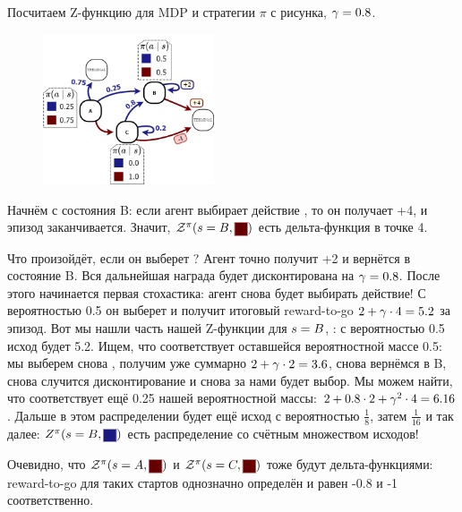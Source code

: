 \begin{exampleBox}[label=ex:zfunction]{}
Посчитаем Z-функцию для MDP и стратегии $\pi$ с рисунка, $\gamma \HM= 0.8$.

\begin{figure}
\vspace{-0.5cm}
\centering
\includegraphics[width=0.45\textwidth]{Images/Value.png}
\vspace{-0.9cm}
\end{figure}

Начнём с состояния B: если агент выбирает действие , то он получает +4, и эпизод заканчивается. Значит, $\Z^{\pi}(s \HM= B, \colorsquare{ChadRed})$ есть дельта-функция в точке 4.

Что произойдёт, если он выберет ? Агент точно получит +2 и вернётся в состояние B. Вся дальнейшая награда будет дисконтирована на $\gamma \HM= 0.8$. После этого начинается первая стохастика: агент снова будет выбирать действие! С вероятностью 0.5 он выберет  и получит итоговый reward-to-go $2 \HM+ \gamma \cdot 4 \HM= 5.2$ за эпизод. Вот мы нашли часть нашей Z-функции для $s \HM= B$, : с вероятностью 0.5 исход будет 5.2. Ищем, что соответствует оставшейся вероятностной массе 0.5: мы выберем снова , получим уже суммарно $2 \HM+ \gamma \cdot 2 \HM= 3.6$, снова вернёмся в B, снова случится дисконтирование и снова за нами будет выбор. Мы можем найти, что соответствует ещё 0.25 нашей вероятностной массы: $2 \HM+ 0.8 \cdot 2 + \gamma^2 \cdot 4 \HM= 6.16$. Дальше в этом распределении будет ещё исход с вероятностью $\frac{1}{8}$, затем $\frac{1}{16}$ и так далее: $Z^{\pi}(s \HM= B, \colorsquare{ChadBlue})$ есть распределение со счётным множеством исходов!

Очевидно, что $\Z^{\pi}(s \HM= A, \text{\colorsquare{ChadRed}})$ и $\Z^{\pi}(s \HM= C, \text{\colorsquare{ChadRed}})$ тоже будут дельта-функциями: reward-to-go для таких стартов однозначно определён и равен -0.8 и -1 соответственно. 


\end{exampleBox}
